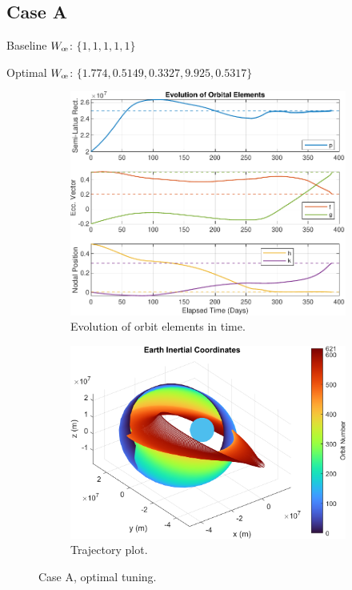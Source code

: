\subsection{Case A}
\label{sec:bench_case_plot}
Baseline \(W_{\moe}\): \(\{1, 1, 1, 1, 1\}\)


Optimal \(W_{\moe}\): \(\{1.774, 0.5149, 0.3327, 9.925, 0.5317\}\)

\begin{figure}[H]
    \centering
    \begin{subfigure}[t]{0.49\textwidth}
        \includegraphics[width=\textwidth]{figures/benchmark_optim/orbital_elements.pdf}
        \caption{Evolution of orbit elements in time.}
        \label{fig:results_benchmark_optim_a}
    \end{subfigure}
    \begin{subfigure}[t]{0.49\textwidth}
        \includegraphics[width=\textwidth]{figures/benchmark_optim/trajectory_plot.png}
        \caption{Trajectory plot.}
        \label{fig:results_benchmark_optim_b}
    \end{subfigure}
    \caption{Case A, optimal tuning.}
    \label{fig:results_benchmark_optim}
\end{figure}


